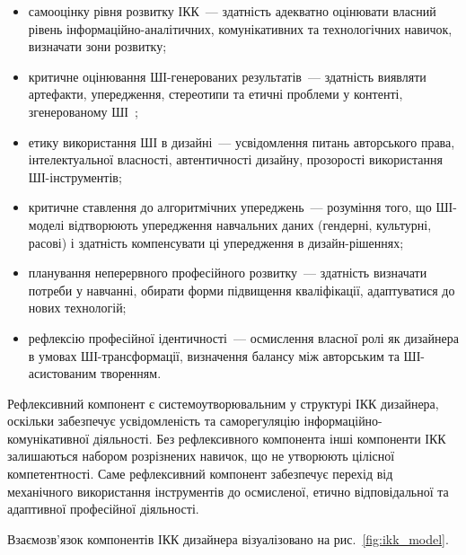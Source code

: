 \begin{itemize}
    \item самооцінку рівня розвитку ІКК~--- здатність адекватно оцінювати власний рівень інформаційно-аналітичних, комунікативних та технологічних навичок, визначати зони розвитку;
    \item критичне оцінювання ШІ-генерованих результатів~--- здатність виявляти артефакти, упередження, стереотипи та етичні проблеми у контенті, згенерованому ШІ~\cite{Musiienko2026ScopingReview};
    \item етику використання ШІ в дизайні~--- усвідомлення питань авторського права, інтелектуальної власності, автентичності дизайну, прозорості використання ШІ-інструментів;
    \item критичне ставлення до алгоритмічних упереджень~--- розуміння того, що ШІ-моделі відтворюють упередження навчальних даних (гендерні, культурні, расові) і здатність компенсувати ці упередження в дизайн-рішеннях;
    \item планування неперервного професійного розвитку~--- здатність визначати потреби у навчанні, обирати форми підвищення кваліфікації, адаптуватися до нових технологій;
    \item рефлексію професійної ідентичності~--- осмислення власної ролі як дизайнера в умовах ШІ-трансформації, визначення балансу між авторським та ШІ-асистованим творенням.
\end{itemize}

Рефлексивний компонент є системоутворювальним у структурі ІКК дизайнера, оскільки забезпечує усвідомленість та саморегуляцію інформаційно-комунікативної діяльності. Без рефлексивного компонента інші компоненти ІКК залишаються набором розрізнених навичок, що не утворюють цілісної компетентності. Саме рефлексивний компонент забезпечує перехід від механічного використання інструментів до осмисленої, етично відповідальної та адаптивної професійної діяльності.


Взаємозв'язок компонентів ІКК дизайнера візуалізовано на рис.~\ref{fig:ikk_model}.

